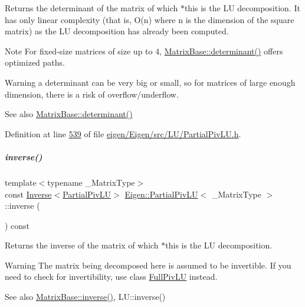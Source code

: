 \begin{DoxyReturn}{Returns}
the determinant of the matrix of which $\ast$this is the LU decomposition. It has only linear complexity (that is, O(n) where n is the dimension of the square matrix) as the LU decomposition has already been computed.
\end{DoxyReturn}
\begin{DoxyNote}{Note}
For fixed-\/size matrices of size up to 4, \hyperlink{group___core___module_a7ad8f77004bb956b603bb43fd2e3c061}{Matrix\+Base\+::determinant()} offers optimized paths.
\end{DoxyNote}
\begin{DoxyWarning}{Warning}
a determinant can be very big or small, so for matrices of large enough dimension, there is a risk of overflow/underflow.
\end{DoxyWarning}
\begin{DoxySeeAlso}{See also}
\hyperlink{group___core___module_a7ad8f77004bb956b603bb43fd2e3c061}{Matrix\+Base\+::determinant()} 
\end{DoxySeeAlso}


Definition at line \hyperlink{eigen_2_eigen_2src_2_l_u_2_partial_piv_l_u_8h_source_l00539}{539} of file \hyperlink{eigen_2_eigen_2src_2_l_u_2_partial_piv_l_u_8h_source}{eigen/\+Eigen/src/\+L\+U/\+Partial\+Piv\+L\+U.\+h}.

\mbox{\label{group___l_u___module_aef983470f92aba829e861e32e68681b5}} 
\subparagraph{\texorpdfstring{inverse()}{inverse()}\hspace{0.1cm}{\footnotesize\ttfamily [1/2]}}
{\footnotesize\ttfamily template$<$typename \+\_\+\+Matrix\+Type$>$ \\
const \hyperlink{class_eigen_1_1_inverse}{Inverse}$<$\hyperlink{group___l_u___module_class_eigen_1_1_partial_piv_l_u}{Partial\+Piv\+LU}$>$ \hyperlink{group___l_u___module_class_eigen_1_1_partial_piv_l_u}{Eigen\+::\+Partial\+Piv\+LU}$<$ \+\_\+\+Matrix\+Type $>$\+::inverse (\begin{DoxyParamCaption}{ }\end{DoxyParamCaption}) const\hspace{0.3cm}{\ttfamily [inline]}}

\begin{DoxyReturn}{Returns}
the inverse of the matrix of which $\ast$this is the LU decomposition.
\end{DoxyReturn}
\begin{DoxyWarning}{Warning}
The matrix being decomposed here is assumed to be invertible. If you need to check for invertibility, use class \hyperlink{group___l_u___module_class_eigen_1_1_full_piv_l_u}{Full\+Piv\+LU} instead.
\end{DoxyWarning}
\begin{DoxySeeAlso}{See also}
\hyperlink{group___core___module_a7712eb69e8ea3c8f7b8da1c44dbdeebf}{Matrix\+Base\+::inverse()}, L\+U\+::inverse() 
\end{DoxySeeAlso}


